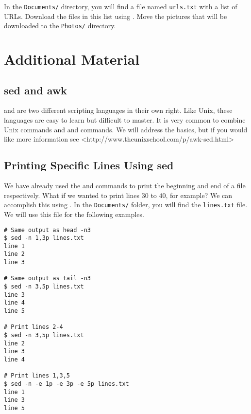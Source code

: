 \begin{problem}
In the \texttt{Documents/} directory, you will find a file named \texttt{urls.txt} with a list of URLs.
Download the files in this list using .
Move the pictures that will be downloaded to the \texttt{Photos/} directory.
\end{problem}

\newpage

\section*{Additional Material} %

\subsection*{sed and awk} %

 and  are two different scripting languages in their own right.
Like Unix, these languages are easy to learn but difficult to master.
It is very common to combine Unix commands and  and  commands.
We will address the basics, but if you would like more information see <http://www.theunixschool.com/p/awk-sed.html>

\subsection*{Printing Specific Lines Using sed} %

We have already used the  and  commands to print the beginning and end of a file respectively.
What if we wanted to print lines $30$ to $40$, for example?
We can accomplish this using .
In the \texttt{Documents/} folder, you will find the \texttt{lines.txt} file.
We will use this file for the following examples.

\begin{lstlisting}
# Same output as head -n3
$ sed -n 1,3p lines.txt
line 1
line 2
line 3

# Same output as tail -n3
$ sed -n 3,5p lines.txt
line 3
line 4
line 5

# Print lines 2-4
$ sed -n 3,5p lines.txt
line 2
line 3
line 4

# Print lines 1,3,5
$ sed -n -e 1p -e 3p -e 5p lines.txt
line 1
line 3
line 5
\end{lstlisting}


